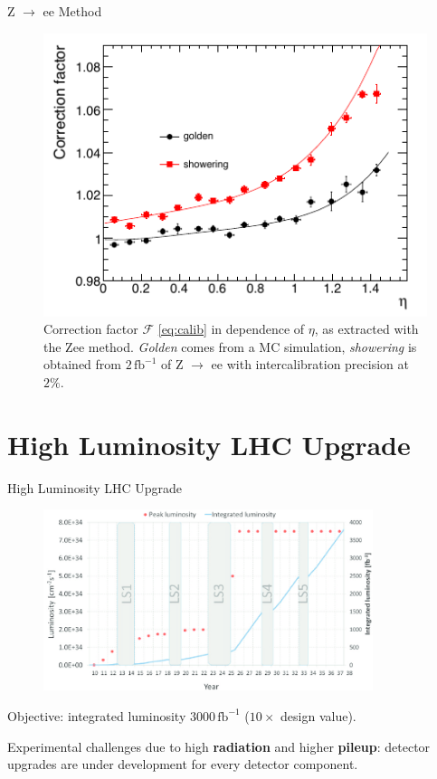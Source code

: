 \documentclass[10pt]{beamer}
\begin{document}
\begin{frame}{Z $\rightarrow$ ee Method}
    \begin{figure}
        \centering
        \includegraphics[width=.75\textwidth]{./img/Zee_corr_factor.png}
        \caption{Correction factor $\mathcal{F}$ \eqref{eq:calib} in dependence of $ \eta$, as extracted with the Zee method. \emph{Golden} comes from a MC simulation, \emph{showering} is obtained from $2\,\text{fb}^{-1}$ of Z $\rightarrow$ ee with intercalibration precision at $2\%$.}
        \label{fig:Zee_correction_factor}
    \end{figure}
\end{frame}

\section[High Luminosity LHC Upgrade]{High Luminosity LHC Upgrade}

\begin{frame}{High Luminosity LHC Upgrade}
    \begin{figure}
        \centering
        \includegraphics[height=150pt]{img/upgrade/luminosity.png}
    \end{figure}{}
    Objective: integrated luminosity $3000\,\text{fb}^{-1}$ ($10\times$ design value).
    
    Experimental challenges due to high \textbf{radiation} and higher \textbf{pileup}: detector upgrades are under development for every detector component.
\end{frame}
\end{document}
